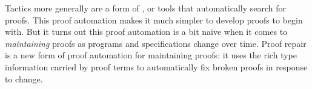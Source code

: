 Tactics more generally are a form of , or tools that automatically search for proofs.
This proof automation makes it much simpler to develop proofs to begin with.
But it turns out this proof automation is a bit naive when it comes to \textit{maintaining} proofs
as programs and specifications change over time.
Proof repair is a new form of proof automation for maintaining proofs: it uses the rich type information carried by proof terms
to automatically fix broken proofs in response to change.



